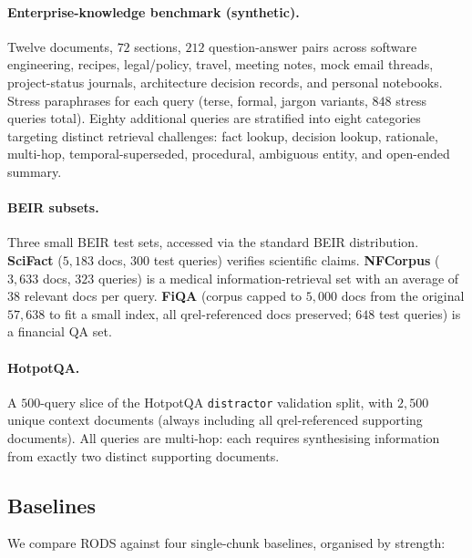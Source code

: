 \documentclass[11pt]{article}
\begin{document}
\paragraph{Enterprise-knowledge benchmark (synthetic).}
Twelve documents, $72$ sections, $212$ question-answer pairs across
software engineering, recipes, legal/policy, travel, meeting notes,
mock email threads, project-status journals, architecture decision
records, and personal notebooks. Stress paraphrases for each query
(terse, formal, jargon variants, $848$ stress queries total). Eighty
additional queries are stratified into eight categories targeting
distinct retrieval challenges: fact lookup, decision lookup,
rationale, multi-hop, temporal-superseded, procedural, ambiguous
entity, and open-ended summary.

\paragraph{BEIR subsets.}
Three small BEIR test sets, accessed via the standard BEIR distribution.
\textbf{SciFact} ($5{,}183$ docs, $300$ test queries) verifies scientific
claims. \textbf{NFCorpus} ($3{,}633$ docs, $323$ queries) is a medical
information-retrieval set with an average of $38$ relevant docs per
query. \textbf{FiQA} (corpus capped to $5{,}000$ docs from the original
$57{,}638$ to fit a small index, all qrel-referenced docs preserved;
$648$ test queries) is a financial QA set.

\paragraph{HotpotQA.}
A $500$-query slice of the HotpotQA \texttt{distractor} validation
split, with $2{,}500$ unique context documents (always including all
qrel-referenced supporting documents). All queries are multi-hop:
each requires synthesising information from exactly two distinct
supporting documents.

\subsection{Baselines}
\label{sec:baselines}

We compare RODS against four single-chunk baselines, organised by
strength:
\end{document}
